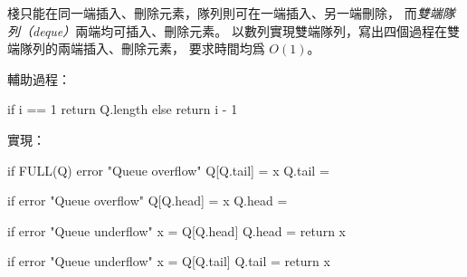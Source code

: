 \startEXERCISE
棧只能在同一端插入、刪除元素，隊列則可在一端插入、另一端刪除，
而\emph{雙端隊列（deque）}兩端均可插入、刪除元素。
以數列實現雙端隊列，寫出四個過程在雙端隊列的兩端插入、刪除元素，
要求時間均爲 $O(1)$。
\stopEXERCISE

\startANSWER
輔助過程：

\startCLRSCODE
if i == 1
	return Q.length
else
	return i - 1
\stopCLRSCODE

實現：

\startCLRSCODE
if FULL(Q)
	error "Queue overflow"
Q[Q.tail] = x
Q.tail = 
\stopCLRSCODE

\startCLRSCODE
if 
	error "Queue overflow"
Q[Q.head] = x
Q.head = 
\stopCLRSCODE

\startCLRSCODE
if 
	error "Queue underflow"
x = Q[Q.head]
Q.head = 
return x
\stopCLRSCODE

\startCLRSCODE
if 
	error "Queue underflow"
x = Q[Q.tail]
Q.tail = 
return x
\stopCLRSCODE
\stopANSWER
